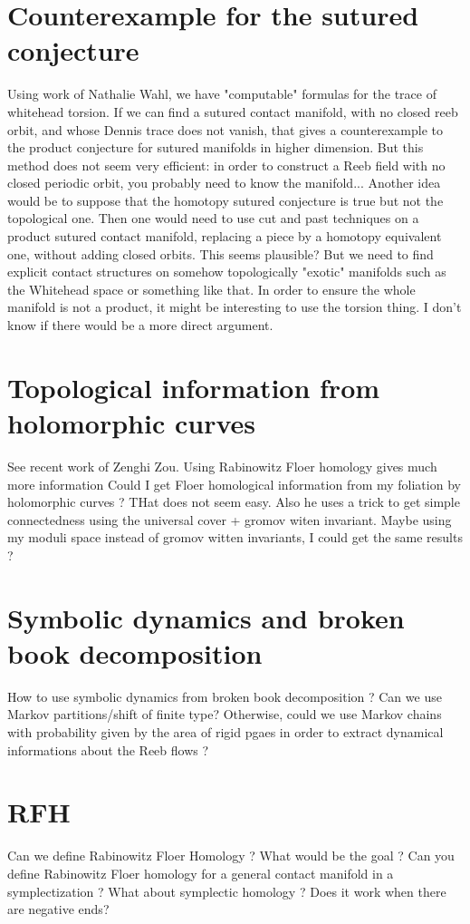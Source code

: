 \documentclass[a4paper,11pt]{article}
\begin{document}
\section{Counterexample for the sutured conjecture}

Using work of Nathalie Wahl, we have "computable" formulas for the trace of whitehead torsion.
If we can find a sutured contact manifold, with no closed reeb orbit, and whose Dennis trace does not vanish,
that gives a counterexample to the product conjecture for sutured manifolds in higher dimension.
But this method does not seem very efficient: in order to construct a Reeb field with no closed periodic orbit,
you probably need to know the manifold... 
Another idea would be to suppose that the homotopy sutured conjecture is true but not the topological one.
Then one would need to use cut and past techniques on a product sutured contact manifold, replacing a piece by a homotopy equivalent 
one, without adding closed orbits. This seems plausible? But we need to find explicit contact structures on somehow topologically "exotic" manifolds 
such as the Whitehead space or something like that. 
In order to ensure the whole manifold is not a product, it might be interesting to use the torsion thing.
I don't know if there would be a more direct argument.

\section{Topological information from holomorphic curves}


See recent work of Zenghi Zou. Using Rabinowitz Floer homology gives much more information
Could I get Floer homological information from my foliation by holomorphic curves ? THat does not seem easy.
Also he uses a trick to get simple connectedness using the universal cover + gromov witen invariant. 
Maybe using my moduli space instead of gromov witten invariants, I could get the same results ? 


\section{Symbolic dynamics and broken book decomposition}


How to use symbolic dynamics from broken book decomposition ?
Can we use Markov partitions/shift of finite type?
Otherwise, could we use Markov chains with probability given by the area of rigid pgaes
in order to extract dynamical informations about the Reeb flows ?


\section{RFH}

Can we define Rabinowitz Floer Homology ? What would be the goal ?
Can you define Rabinowitz Floer homology for a general contact manifold in a symplectization ?
What about symplectic homology ? Does it work when there are negative ends?
 
\end{document}
